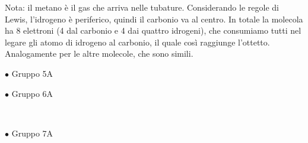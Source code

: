     \vspace{0.2cm}Nota: il metano è il gas che arriva nelle tubature. Considerando le regole di Lewis, l'idrogeno è periferico, quindi il carbonio va al centro. In totale la molecola ha 8 elettroni (4 dal carbonio e 4 dai quattro idrogeni), che consumiamo tutti nel legare gli atomo di idrogeno al carbonio, il quale così raggiunge l'ottetto. Analogamente per le altre molecole, che sono simili.

    \vspace{0.2cm}$\bullet$ Gruppo 5A
    
    \vspace{0.2cm}

    \qquad
    \qquad
    \qquad 

    \vspace{0.2cm}$\bullet$ Gruppo 6A
    
    \vspace{0.2cm}

    \qquad
    \qquad
    \qquad \,

    \vspace{0.2cm}$\bullet$ Gruppo 7A
    
    \vspace{0.2cm}

